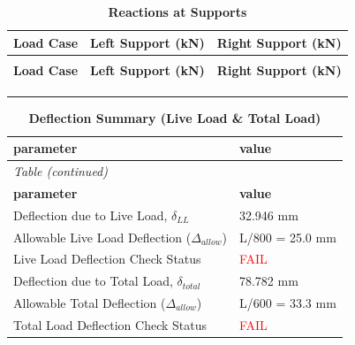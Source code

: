 \documentclass[12pt,a4paper]{report}
\numberwithin{table}{chapter}
\numberwithin{figure}{chapter}
\begin{document}
\vspace{1em}
\begin{longtable}{|>{\centering\arraybackslash}p{5.2cm}|>{\centering\arraybackslash}p{5.2cm}|>{\centering\arraybackslash}p{5.2cm}|}
\caption{\textbf{Reactions at Supports}}\\
\hline
\rowcolor{tableHeader}
\textbf{Load Case} & \textbf{Left Support (kN)} & \textbf{Right Support (kN)} \\[6pt]
\hline
\endfirsthead
\multicolumn{3}{l}{\small\itshape Table \thetable{} (continued)}\\
\hline
\rowcolor{tableHeader}
\textbf{Load Case} & \textbf{Left Support (kN)} & \textbf{Right Support (kN)} \\[6pt]
\hline
\endhead
 &  &  \\[6pt]
\hline
 &  &  \\[6pt]
\hline
 &  &  \\[6pt]
\hline
\end{longtable}

\vspace{1em}
\begin{longtable}{|L{7cm}|p{8.5cm}|}
\caption{\textbf{Deflection Summary (Live Load \& Total Load)}}\\
\hline
{}
\textbf{parameter} & \textbf{value} \\
\hline
\endfirsthead
{}\\
\hline
{}
\textbf{parameter} & \textbf{value} \\
\hline
\endhead
\textnormal{Deflection due to Live Load, $\delta_{LL}$} & 32.946 mm \\[6pt]
\hline
\textnormal{Allowable Live Load Deflection ($\Delta_{allow}$)} & L/800 = 25.0 mm \\[6pt]
\hline
\textnormal{Live Load Deflection Check Status} & \textcolor{red}{FAIL} \\[6pt]
\hline
\textnormal{Deflection due to Total Load, $\delta_{total}$} & 78.782 mm \\[6pt]
\hline
\textnormal{Allowable Total Deflection ($\Delta_{allow}$)} & L/600 = 33.3 mm \\[6pt]
\hline
\textnormal{Total Load Deflection Check Status} & \textcolor{red}{FAIL} \\[6pt]
\hline
\end{longtable}

\vspace{1em}
\noindent
\noindent{}
\noindent{}
\noindent{}
\end{document}
